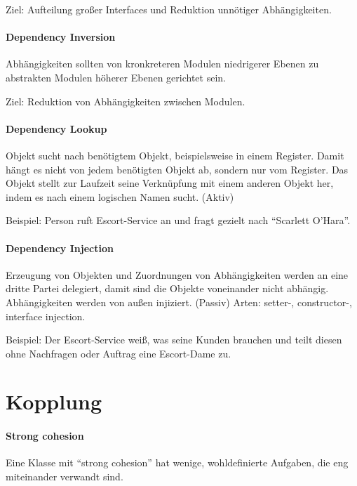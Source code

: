Ziel: Aufteilung großer Interfaces und Reduktion unnötiger
Abhängigkeiten.

\paragraph{Dependency Inversion}\label{dependency-inversion}

Abhängigkeiten sollten von kronkreteren Modulen niedrigerer Ebenen zu
abstrakten Modulen höherer Ebenen gerichtet sein.

Ziel: Reduktion von Abhängigkeiten zwischen Modulen.

\paragraph{Dependency Lookup}\label{dependency-lookup}

Objekt sucht nach benötigtem Objekt, beispielsweise in einem Register.
Damit hängt es nicht von jedem benötigten Objekt ab, sondern nur vom
Register. Das Objekt stellt zur Laufzeit seine Verknüpfung mit einem
anderen Objekt her, indem es nach einem logischen Namen sucht. (Aktiv)

Beispiel: Person ruft Escort-Service an und fragt gezielt nach
``Scarlett O'Hara''.

\paragraph{Dependency Injection}\label{dependency-injection}

Erzeugung von Objekten und Zuordnungen von Abhängigkeiten werden an eine
dritte Partei delegiert, damit sind die Objekte voneinander nicht
abhängig. Abhängigkeiten werden von außen injiziert. (Passiv)
Arten: setter-, constructor-, interface injection.

Beispiel: Der Escort-Service weiß, was seine Kunden brauchen und teilt
diesen ohne Nachfragen oder Auftrag eine Escort-Dame zu.

\section{Kopplung}\label{kopplung}

\paragraph{Strong cohesion}\label{strong-cohesion}

Eine Klasse mit ``strong cohesion'' hat wenige, wohldefinierte Aufgaben,
die eng miteinander verwandt sind.

